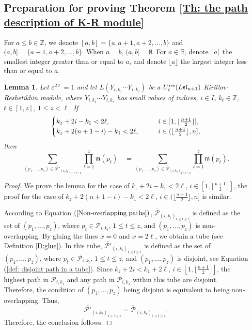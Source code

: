 \documentclass[12pt, reqno]{amsart}
\newtheorem{lemma}[theorem]{Lemma}
\numberwithin{equation}{section}
\newcommand{\ZZ}{\mathbb{Z}}
\newcommand{\res}{{\rm res}}
\begin{document}
{\subsection{Preparation for proving Theorem \ref{Th: the path description of K-R module}} \label{subsec:lemmas for proving theorem of path description of KR modules}

For $a \leq b \in \mathbb{Z}$, we denote $[a,b] = \{a, a+1, a+2, \ldots, b\}$ and $(a,b] = \{a+1, a+2, \ldots, b\}$. When $a=b$, $(a,b] = \emptyset$. For $a\in \mathbb{R}$, denote $\lceil a\rceil$ the smallest integer greater than or equal to $a$, and denote $\lfloor a\rfloor$ the largest integer less than or equal to $a$.

\begin{lemma}\label{Lem: the disjoint path for z small}
Let $\varepsilon^{2 \ell}=1$ and let $L(Y_{i,k_1}\cdots Y_{i,k_z})$ be a $U_{\varepsilon}^{\res}({L\mathfrak{sl}_{n+1}})$ Kirillov-Reshetikhin module, where $Y_{i,k_1}\cdots Y_{i,k_z}$ has small values of indices, $i\in I$, $k_t\in\ZZ$, $t\in[1,z]$, $1\leq z< \ell$. If
\begin{align*}
\begin{cases} k_z+2i-k_1<2 \ell, & {\hskip 2em} i\in [1, \lfloor \frac{n+1}2 \rfloor],\\
              k_z+2(n+1-i)-k_1<2 \ell, & {\hskip 2em} i\in (\lfloor \frac{n+1}2 \rfloor, n],
\end{cases}
\end{align*}
then
\[
\sum_{(p_{1},\ldots,p_{z}) \in \overline{\mathscr{P'}}_{(i,k_t)_{1 \leq t \leq z}}} \prod_{t=1}^{z}\mathfrak{m}(p_{t})\quad=\sum_{(p_{1},\ldots,p_{z}) \in \overline{\mathscr{P}}_{(i,k_t)_{1 \leq t \leq z}}} \prod_{t=1}^{z}\mathfrak{m}(p_{t}).
\]
\end{lemma}

\begin{proof}
We prove the lemma for the case of $k_z+2i-k_1< 2 \ell$, $i\in [1, \lfloor \frac{n+1}2 \rfloor ]$, the proof for the case of $k_z+2(n+1-i)-k_1< 2 \ell$, $i\in (\lfloor \frac{n+1}2 \rfloor, n]$ is similar. 

According to Equation $(\ref{Non-overlapping paths})$, $\overline{\mathscr{P}}_{(i,k_{t})_{1\leq t\leq z}}$ is defined as the set of $(p_{1},\ldots,p_{z})$, where $p_{t}\in \mathscr{P}_{i,k_{t}}$, $1\leq t\leq z$, and $(p_{1},\ldots,p_{z})$ is non-overlapping. By gluing the lines $x=0$ and $x=2 \ell$, we obtain a tube (see Definition \ref{D:glue}). In this tube, $\overline{\mathscr{P'}}_{{{(i,k_t)}_{1\leq t\leq z}}}$ is defined as the set of $(p_{1},\ldots,p_{z})$, where $p_{t}\in \mathscr{P}_{i,k_t}$, $1\leq t\leq z$, and $(p_{1},\ldots,p_{z})$ is disjoint, see Equation (\ref{def: disjoint path in a tube}). Since $k_z+2i<k_1+2 \ell$, $i\in [1, \lfloor \frac{n+1}2 \rfloor ]$, the highest path in $\mathscr{P}_{i,k_1}$ and any path in $\mathscr{P}_{i,k_z}$ within this tube are disjoint. Therefore, the condition of $(p_{1},\ldots,p_{z})$ being disjoint is equivalent to being non-overlapping. Thus, 
\[
\overline{\mathscr{P'}}_{{{(i,k_t)}_{1\leq t\leq z}}} = \overline{\mathscr{P}}_{(i,k_{t})_{1\leq t\leq z}}.
\]
Therefore, the conclusion follows.
\end{proof}

}
\end{document}
